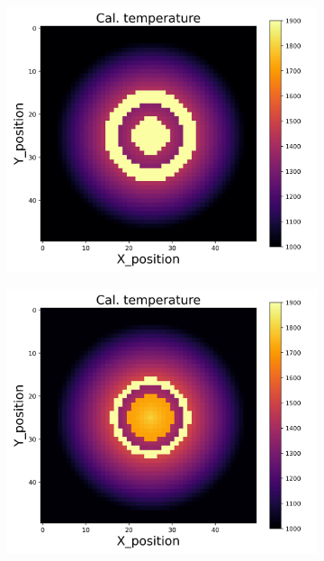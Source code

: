 {\begin{figure}[p]
\begin{minipage}{\textwidth}
\begin{subfigure}{0.325\textwidth}
        \end{subfigure}
    \end{minipage}\\
    \begin{minipage}{\textwidth}
        \centering
        \begin{subfigure}{0.325\textwidth}
            \centering
            \includegraphics[width=\textwidth]{figures/raw_data/22/quad/T_cal.jpg}
        \end{subfigure}
        \begin{subfigure}{0.325\textwidth}
            \centering
            \includegraphics[width=\textwidth]{figures/raw_data/23/quad/T_cal.jpg}

\end{subfigure}
\end{minipage}
\end{figure}}
